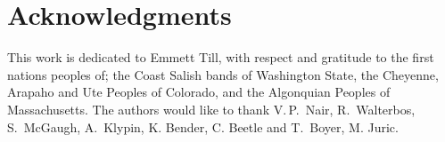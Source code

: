 \documentclass[reprint,%
 amsmath,amssymb,
 aps,
]{revtex4-1}
\begin{document}
   

  \section[]{Acknowledgments}
 This work is dedicated to Emmett Till, with respect and gratitude to the first nations peoples of;  the Coast Salish bands of Washington State, 
 the Cheyenne, Arapaho and Ute  Peoples of Colorado, and the Algonquian Peoples of Massachusetts. 
  The authors would like to thank    V.\,P.\,  Nair,   R.\, Walterbos, S.\ McGaugh,  A.\, Klypin, K. Bender, C. Beetle and     T.\, Boyer, M. Juric.   \\
  
 

 
\end{document}
